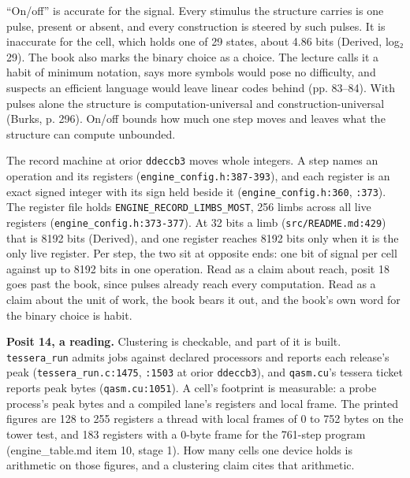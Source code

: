 “On/off” is accurate for the signal. Every stimulus the structure carries is one pulse, present or absent, and every construction is steered by such pulses. It is inaccurate for the cell, which holds one of 29 states, about 4.86 bits (Derived, log₂ 29). The book also marks the binary choice as a choice. The lecture calls it a habit of minimum notation, says more symbols would pose no difficulty, and suspects an efficient language would leave linear codes behind (pp. 83–84). With pulses alone the structure is computation-universal and construction-universal (Burks, p. 296). On/off bounds how much one step moves and leaves what the structure can compute unbounded.

The record machine at orior \texttt{ddeccb3} moves whole integers. A step names an operation and its registers (\texttt{engine\_\allowbreak{}config.\allowbreak{}h:387-\allowbreak{}393}), and each register is an exact signed integer with its sign held beside it (\texttt{engine\_\allowbreak{}config.\allowbreak{}h:360}, \texttt{:373}). The register file holds \texttt{ENGINE\_\allowbreak{}RECORD\_\allowbreak{}LIMBS\_\allowbreak{}MOST}, 256 limbs across all live registers (\texttt{engine\_\allowbreak{}config.\allowbreak{}h:373-\allowbreak{}377}). At 32 bits a limb (\texttt{src/\allowbreak{}README.\allowbreak{}md:429}) that is 8192 bits (Derived), and one register reaches 8192 bits only when it is the only live register. Per step, the two sit at opposite ends: one bit of signal per cell against up to 8192 bits in one operation. Read as a claim about reach, posit 18 goes past the book, since pulses already reach every computation. Read as a claim about the unit of work, the book bears it out, and the book's own word for the binary choice is habit.

\textbf{Posit 14, a reading.} Clustering is checkable, and part of it is built. \texttt{tessera\_\allowbreak{}run} admits jobs against declared processors and reports each release's peak (\texttt{tessera\_\allowbreak{}run.\allowbreak{}c:1475}, \texttt{:1503} at orior \texttt{ddeccb3}), and \texttt{qasm.\allowbreak{}cu}'s tessera ticket reports peak bytes (\texttt{qasm.\allowbreak{}cu:1051}). A cell's footprint is measurable: a probe process's peak bytes and a compiled lane's registers and local frame. The printed figures are 128 to 255 registers a thread with local frames of 0 to 752 bytes on the tower test, and 183 registers with a 0-byte frame for the 761-step program (engine\_\allowbreak{}table.md item 10, stage 1). How many cells one device holds is arithmetic on those figures, and a clustering claim cites that arithmetic.

